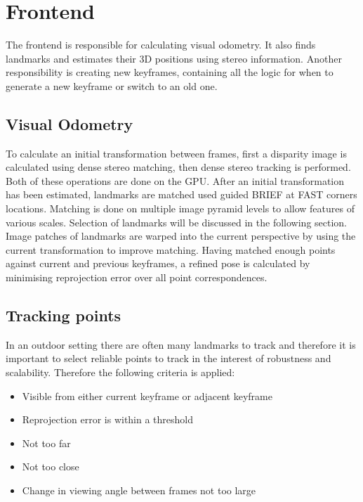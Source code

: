 \section{Frontend}
\label{sec:scavislam_frontend}

The frontend is responsible for calculating visual odometry.  It also finds landmarks and estimates their 3D positions using stereo information.  Another responsibility is creating new keyframes, containing all the logic for when to generate a new keyframe or switch to an old one. 

\subsection{Visual Odometry}

To calculate an initial transformation between frames, first a disparity image is calculated using dense stereo matching\cite{dense_match}, then dense stereo tracking is performed.  Both of these operations are done on the GPU.  After an initial transformation has been estimated, landmarks are matched used guided BRIEF\cite{brief_10} at FAST\cite{rosten_06} corners locations.  Matching is done on multiple image pyramid levels to allow features of various scales. Selection of landmarks will be discussed in the following section.  Image patches of landmarks are warped into the current perspective by using the current transformation to improve matching. Having matched enough points against current and previous keyframes, a refined pose is calculated by minimising reprojection error over all point correspondences.

\subsection{Tracking points}

In an outdoor setting there are often many landmarks to track and therefore it is important to select reliable points to track in the interest of robustness and scalability.  Therefore the following criteria is applied:
\begin{itemize}
 \setlength{\itemsep}{0cm}%
 \setlength{\parskip}{0cm}%
 \item Visible from either current keyframe or adjacent keyframe
 \item Reprojection error is within a threshold
 \item Not too far
 \item Not too close
 \item Change in viewing angle between frames not too large
\end{itemize}

